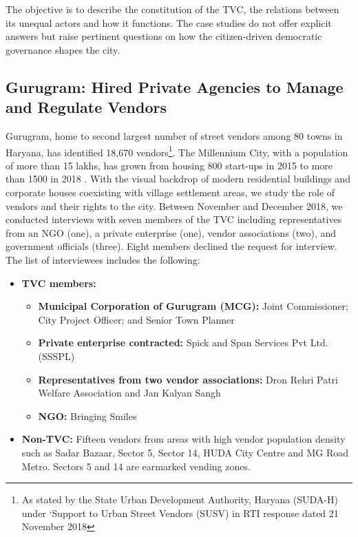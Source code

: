 \documentclass[a4paper, 12pt, twoside]{article}
\begin{document}
The objective is to describe the constitution of the TVC, the relations between its unequal actors and how it functions. The case studies do not offer explicit answers but raise pertinent questions on how the citizen-driven democratic governance shapes the city.

\subsection{Gurugram: Hired Private Agencies to Manage and Regulate Vendors}

Gurugram, home to second largest number of street vendors among 80 towns in Haryana, has identified 18,670 vendors\footnote{As stated by the State Urban Development Authority, Haryana (SUDA-H) under ‘Support to Urban Street Vendors (SUSV) in RTI response dated 21 November 2018}. The Millennium City, with a population of more than 15 lakhs, has grown from housing 800 start-ups in 2015 to more than 1500 in 2018 \cite{vermanews}. With the visual backdrop of modern residential buildings and corporate houses coexisting with village settlement areas, we study the role of vendors and their rights to the city.
Between November and December 2018, we conducted interviews with seven members of the TVC including representatives from an NGO (one), a private enterprise (one), vendor associations (two), and government officials (three). Eight members declined the request for interview. The list of interviewees includes the following:

\begin{itemize}
\item \textbf{TVC members:}
	\begin{itemize}
	\item \textbf{Municipal Corporation of Gurugram (MCG):} Joint Commissioner; City Project Officer; and Senior Town Planner 
	\item \textbf{Private enterprise contracted:} Spick and Span Services Pvt Ltd. (SSSPL)
	\item \textbf{Representatives from two vendor associations:} Dron Rehri Patri Welfare Association and Jan Kalyan Sangh
	\item \textbf{NGO:} Bringing Smiles
	\end{itemize}
\item \textbf{Non-TVC:} Fifteen vendors from areas with high vendor population density such as Sadar Bazaar, Sector 5, Sector 14, HUDA City Centre and MG Road Metro. Sectors 5 and 14 are earmarked vending zones.
\end{itemize}
\end{document}
